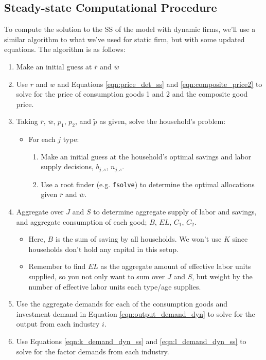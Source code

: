 \documentclass[letterpaper,12pt]{article}
\theoremstyle{definition}
\begin{document}
\begin{spacing}{1.5}
\subsection*{Steady-state Computational Procedure}

To compute the solution to the SS of the model with dynamic firms, we'll use a similar algorithm to what we've used for static firm, but with some updated equations.  The algorithm is as follows:

\begin{enumerate}
\item Make an initial guess at $\bar{r}$ and $\bar{w}$
\item Use $r$ and $w$ and Equations \ref{eqn:price_det_ss} and \ref{eqn:composite_price2} to solve for the price of consumption goods 1 and 2 and the composite good price.
\item Taking $\bar{r}$, $\bar{w}$, $p_{1}$, $p_{2}$, and $\tilde{p}$ as given, solve the household's problem:
	\begin{itemize}
	\item For each $j$ type:
		\begin{enumerate}
		\item Make an initial guess at the household's optimal savings and labor supply decisions, $b_{j,s}$, $n_{j,s}$.
		\item Use a root finder (e.g. \texttt{fsolve}) to determine the optimal allocations given $\bar{r}$ and $\bar{w}$.
		\end{enumerate}
	\end{itemize}
\item Aggregate over $J$ and $S$ to determine aggregate supply of labor and savings, and aggregate consumption of each good; $B$, $EL$, $C_{1}$, $C_{2}$.
	\begin{itemize}
	\item Here, $B$ is the sum of saving by all households.  We won't use $K$ since households don't hold any capital in this setup.
	\item Remember to find $EL$ as the aggregate amount of effective labor units supplied, so you not only want to sum over $J$ and $S$, but weight by the number of effective labor units each type/age supplies.
	\end{itemize}
\item Use the aggregate demands for each of the consumption goods and investment demand in Equation \ref{eqn:output_demand_dyn} to solve for the output from each industry $i$.
\item Use Equations \ref{eqn:k_demand_dyn_ss} and \ref{eqn:l_demand_dyn_ss} to solve for the factor demands from each industry.

\end{enumerate}
\end{spacing}
\end{document}
